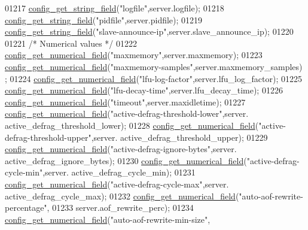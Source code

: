 \begin{DoxyCode}
{{{{{{{{{{01217     \hyperlink{config_8c_a88a85229639d42e707850d558522da27}{config\_get\_string\_field}(\textcolor{stringliteral}{"logfile"},server.logfile);
01218     \hyperlink{config_8c_a88a85229639d42e707850d558522da27}{config\_get\_string\_field}(\textcolor{stringliteral}{"pidfile"},server.pidfile);
01219     \hyperlink{config_8c_a88a85229639d42e707850d558522da27}{config\_get\_string\_field}(\textcolor{stringliteral}{"slave-announce-ip"},server.slave\_announce\_ip);
01220 
01221     \textcolor{comment}{/* Numerical values */}
01222     \hyperlink{config_8c_ac10aa922264623cceca62df3262920c6}{config\_get\_numerical\_field}(\textcolor{stringliteral}{"maxmemory"},server.maxmemory);
01223     \hyperlink{config_8c_ac10aa922264623cceca62df3262920c6}{config\_get\_numerical\_field}(\textcolor{stringliteral}{"maxmemory-samples"},server.maxmemory\_samples)
      ;
01224     \hyperlink{config_8c_ac10aa922264623cceca62df3262920c6}{config\_get\_numerical\_field}(\textcolor{stringliteral}{"lfu-log-factor"},server.lfu\_log\_factor);
01225     \hyperlink{config_8c_ac10aa922264623cceca62df3262920c6}{config\_get\_numerical\_field}(\textcolor{stringliteral}{"lfu-decay-time"},server.lfu\_decay\_time);
01226     \hyperlink{config_8c_ac10aa922264623cceca62df3262920c6}{config\_get\_numerical\_field}(\textcolor{stringliteral}{"timeout"},server.maxidletime);
01227     \hyperlink{config_8c_ac10aa922264623cceca62df3262920c6}{config\_get\_numerical\_field}(\textcolor{stringliteral}{"active-defrag-threshold-lower"},server.
      active\_defrag\_threshold\_lower);
01228     \hyperlink{config_8c_ac10aa922264623cceca62df3262920c6}{config\_get\_numerical\_field}(\textcolor{stringliteral}{"active-defrag-threshold-upper"},server.
      active\_defrag\_threshold\_upper);
01229     \hyperlink{config_8c_ac10aa922264623cceca62df3262920c6}{config\_get\_numerical\_field}(\textcolor{stringliteral}{"active-defrag-ignore-bytes"},server.
      active\_defrag\_ignore\_bytes);
01230     \hyperlink{config_8c_ac10aa922264623cceca62df3262920c6}{config\_get\_numerical\_field}(\textcolor{stringliteral}{"active-defrag-cycle-min"},server.
      active\_defrag\_cycle\_min);
01231     \hyperlink{config_8c_ac10aa922264623cceca62df3262920c6}{config\_get\_numerical\_field}(\textcolor{stringliteral}{"active-defrag-cycle-max"},server.
      active\_defrag\_cycle\_max);
01232     \hyperlink{config_8c_ac10aa922264623cceca62df3262920c6}{config\_get\_numerical\_field}(\textcolor{stringliteral}{"auto-aof-rewrite-percentage"},
01233             server.aof\_rewrite\_perc);
01234     \hyperlink{config_8c_ac10aa922264623cceca62df3262920c6}{config\_get\_numerical\_field}(\textcolor{stringliteral}{"auto-aof-rewrite-min-size"},
}}}}}}}}}}
\end{DoxyCode}
